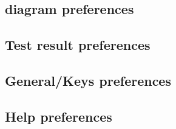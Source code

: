 

\subsection{\gdcase{} diagram preferences}
\label{TasksPrefsModel}


\subsection{Test result preferences}
\label{testresprefs}


\subsection{General/Keys preferences}


\subsection{Help preferences}

